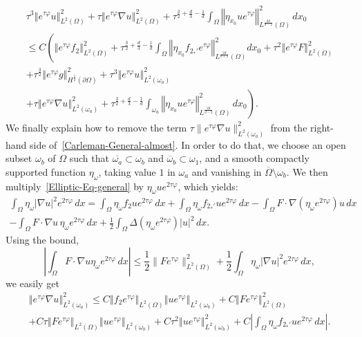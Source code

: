 \documentclass[10pt]{amsart}
\theoremstyle{definition}\newtheorem{defi}[theo]{Definition}\newtheorem{rema}[theo]{Remark}\newtheorem{exam}[theo]{Example}\newtheorem{exem}[theo]{Example}\newtheorem{nota}[theo]{Notation}
\newcommand{\norm}[1]{\left\Vert#1\right\Vert}
\renewcommand{\leq}{\leqslant}
\begin{document}
\begin{multline}\label{Carleman-General-almost}
\tau^{3} \norm{e^{\tau \varphi} u}_{L^2(\Omega)}^2 +
\tau \norm{ e^{\tau \varphi} \nabla u }_{L^2(\Omega)}^2 +
\tau^{\frac{3}{2}+\frac{d}{3}-\frac{1}{d}} \int_{\Omega} \norm{\eta_{x_0} u e^{\tau \varphi}}_{L^{\frac{2d}{d-2}}(\Omega)}^2 \, dx_0
\\
\!\leq \! C \!\left(\!
\norm{ e^{\tau \varphi} f_2}_{L^2(\Omega)}^2\! +\!
\tau^{\frac{3}{2}+\frac{d}{3}-\frac{1}{d}}\!\!\! \int_{\Omega}\! \norm{ \eta_{x_0} f_{2_*'} e^{\tau \varphi}}_{L^{\frac{2d}{d+2}}(\Omega)}^2 \!\!dx_0\! + \!
\tau^2 \norm{e^{\tau \varphi} F}_{L^2(\Omega)}^2\! 
\right.
\\
\left. 
+ \!
\tau^{\frac{3}{2}} \norm{e^{\tau \varphi} g}_{H^{\frac{1}{2}}(\partial \Omega)}^2
+
\tau^{3} \norm{e^{\tau \varphi} u}_{L^2(\omega_a)}^2
\right.
\\
\left. 
+
\tau \norm{e^{\tau \varphi} \nabla u}_{L^2(\omega_a)}^2 +
\tau^{\frac{3}{2}+\frac{d}{3}-\frac{1}{d}} \int_{\omega_a} \norm{ \eta_{x_0} u e^{\tau \varphi} }_{L^{\frac{2d}{d-2}}(\Omega)}^2 \, dx_0
\right).
\end{multline}
We finally explain how to remove the term $\tau \| e^{\tau \varphi} \nabla u \|_{L^2(\omega_a)}^2$ from the right-hand side of~\eqref{Carleman-General-almost}. In order to do that, we choose an open subset $\omega_b$ of $\Omega$ such that $\overline{\omega_a} \subset \omega_b$ and $\overline\omega_b \subset \omega_1$, and a smooth compactly supported function $\eta_\omega$, taking value $1$ in $\omega_a$ and vanishing in $\overline\Omega\setminus \omega_b$. We then multiply~\eqref{Elliptic-Eq-general} by $\eta_\omega u e^{2 \tau \varphi}$, which yields:
\begin{multline*}
\int_\Omega \eta_\omega |\nabla u|^2 e^{2 \tau \varphi} \,dx =
\int_{\Omega} \eta_\omega f_2 u e^{2 \tau \varphi} \, dx +
\int_{\Omega} \eta_\omega f_{2_*'} u e^{2 \tau \varphi} \, dx -
\int_\Omega F \cdot \nabla \left(\eta_\omega e^{2 \tau \varphi}\right) u \, dx
\\
-
\int_\Omega F \cdot \nabla u \, \eta_\omega e^{2 \tau \varphi} \, dx +
\frac{1}{2} \int_\Omega \Delta \left(\eta_\omega e^{2 \tau \varphi}\right) |u|^2 \, dx.
\end{multline*}
Using the bound,
\[
\left |
\int_\Omega F \cdot \nabla u \eta_\omega e^{2 \tau \varphi}\, dx
\right|
\leq
\frac{1}{2} \| F e^{\tau \varphi} \|_{L^2(\Omega)}^2 +
\frac{1}{2} \int_\Omega \eta_\omega |\nabla u|^2 e^{2 \tau \varphi} \, dx,
\]
we easily get
\begin{multline*}
\norm{ e^{\tau \varphi} \nabla u}_{L^2(\omega_a)}^2
\leq C\norm{f_2 e^{\tau \varphi}}_{L^2(\Omega)}
\norm{u e^{\tau \varphi}}_{L^2(\omega_b)} + C \norm{ F e^{\tau \varphi} }_{L^2(\Omega)}^2
\\
+ C \tau\norm{ F e^{\tau \varphi}}_{L^2(\Omega)} \norm{u e^{\tau \varphi}}_{L^2(\omega_b)} + C
\tau^2\norm{u e^{\tau \varphi}}_{L^2(\omega_b)}^2 + C \left| \int_{\Omega} \eta_\omega f_{2_*'} u e^{2 \tau \varphi} \, dx\right|.
\end{multline*}
\end{document}
